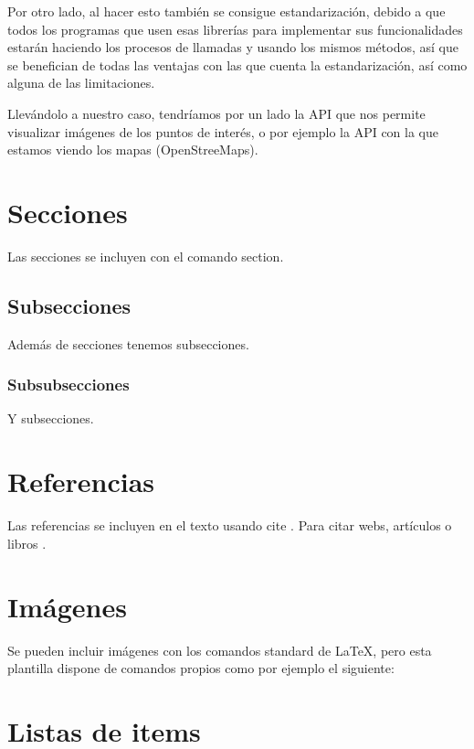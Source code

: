 Por otro lado, al hacer esto también se consigue estandarización, debido a que todos los programas que usen esas librerías para implementar sus funcionalidades estarán haciendo los procesos de llamadas y usando los mismos métodos, así que se benefician de todas las ventajas con las que cuenta la estandarización, así como alguna de las limitaciones.

Llevándolo a nuestro caso, tendríamos por un lado la API que nos permite visualizar imágenes de los puntos de interés, o por ejemplo la API con la que estamos viendo los mapas (OpenStreeMaps).

\section{Secciones}

Las secciones se incluyen con el comando section.

\subsection{Subsecciones}

Además de secciones tenemos subsecciones.

\subsubsection{Subsubsecciones}

Y subsecciones. 


\section{Referencias}

Las referencias se incluyen en el texto usando cite \cite{wiki:latex}. Para citar webs, artículos o libros \cite{koza92}.


\section{Imágenes}

Se pueden incluir imágenes con los comandos standard de \LaTeX, pero esta plantilla dispone de comandos propios como por ejemplo el siguiente:




\section{Listas de items}

